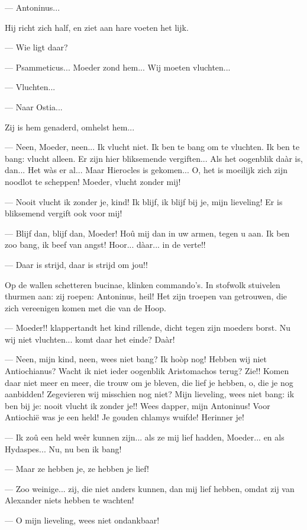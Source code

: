 \documentclass[a4paper, 12pt, oneside, dutch]{article}
\begin{document}
--- Antoninus...

Hij richt zich half, en ziet aan hare voeten het lijk.

--- Wie ligt daar?

--- Psammeticus... Moeder zond hem... Wij moeten vluchten...

--- Vluchten...

--- Naar Ostia...

Zij is hem genaderd, omhelst hem...

--- Neen, Moeder, neen... Ik vlucht niet. Ik ben te bang om te vluchten. Ik ben te bang: vlucht alleen. Er zijn hier bliksemende vergiften... Als het oogenblik daàr is, dan... Het wàs er al... Maar Hierocles is gekomen... O, het is moeilijk zich zijn noodlot te scheppen! Moeder, vlucht zonder mij!

--- Nooit vlucht ik zonder je, kind! Ik blijf, ik blijf bij je, mijn lieveling! Er is bliksemend vergift ook voor mij!

--- Blijf dan, blijf dan, Moeder! Hoû mij dan in uw armen, tegen u aan. Ik ben zoo bang, ik beef van angst! Hoor... dàar... in de verte!!

--- Daar is strijd, daar is strijd om jou!!

Op de wallen schetteren bucinae, klinken commando's. In stofwolk stuivelen thurmen aan: zij roepen: Antoninus, heil! Het zijn troepen van getrouwen, die zich vereenigen komen met die van de Hoop.

--- Moeder!! klappertandt het kind rillende, dicht tegen zijn moeders borst. Nu wij niet vluchten... komt daar het einde? Daàr!

--- Neen, mijn kind, neen, wees niet bang? Ik hoòp nog! Hebben wij niet Antiochianus? Wacht ik niet ieder oogenblik Aristomachos terug? Zie!! Komen daar niet meer en meer, die trouw om je bleven, die lief je hebben, o, die je nog aanbidden! Zegevieren wij misschien nog niet? Mijn lieveling, wees niet bang: ik ben bij je: nooit vlucht ik zonder je!! Wees dapper, mijn Antoninus! Voor Antiochië was je een held! Je gouden chlamys wuifde! Herinner je!

--- Ik zoû een held weêr kunnen zijn... als ze mij lief hadden, Moeder... en als Hydaspes... Nu, nu ben ik bang!

--- Maar ze hebben je, ze hebben je lief!

--- Zoo weinige... zij, die niet anders kunnen, dan mij lief hebben, omdat zij van Alexander niets hebben te wachten!

--- O mijn lieveling, wees niet ondankbaar!
\end{document}
